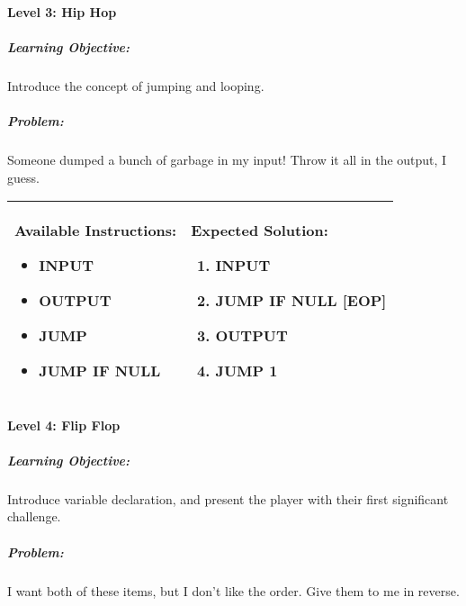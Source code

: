 \paragraph{Level 3: Hip Hop}
\subparagraph{Learning Objective:} Introduce the concept of jumping and looping.

\subparagraph{Problem:} Someone dumped a bunch of garbage in my input! Throw it all in the output, I guess.

\begin{center}
    \begin{tabular}{ | m{6cm} | m{8cm} | } 
        \hline
            \textbf{Available Instructions:} 
            \begin{itemize}
                \setlength\itemsep{-.35em}
                \item INPUT
                \item OUTPUT
                \item JUMP
                \item JUMP IF NULL
            \end{itemize}& 
            \textbf{Expected Solution:} 
            \begin{enumerate}
                \setlength\itemsep{-.35em}
                \item INPUT
                \item JUMP IF NULL [EOP]
                \item OUTPUT
                \item JUMP 1
            \end{enumerate}
            \\
        \hline
    \end{tabular}
\end{center}


\paragraph{Level 4: Flip Flop}
\subparagraph{Learning Objective:} Introduce variable declaration, and present the player with their first significant challenge.

\subparagraph{Problem:} I want both of these items, but I don't like the order. Give them to me in reverse.

